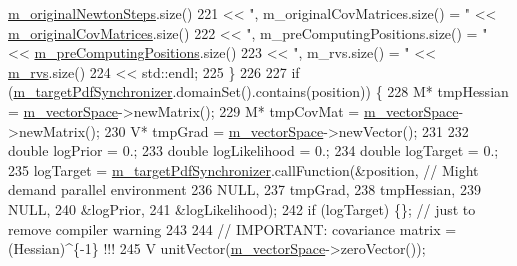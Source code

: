 \begin{DoxyCode}
      \hyperlink{class_q_u_e_s_o_1_1_hessian_cov_matrices_t_k_group_a4c0fe3171a35cdd453a4e23e1438ddf9}{m\_originalNewtonSteps}.size()
221                            << \textcolor{stringliteral}{", m\_originalCovMatrices.size() = "}      << 
      \hyperlink{class_q_u_e_s_o_1_1_hessian_cov_matrices_t_k_group_acc7219917faf933e77694894856fa646}{m\_originalCovMatrices}.size()
222                            << \textcolor{stringliteral}{", m\_preComputingPositions.size() = "}    << 
      \hyperlink{class_q_u_e_s_o_1_1_base_t_k_group_a93d7fe55e30a7c6f209b01cb8a67e322}{m\_preComputingPositions}.size()
223                            << \textcolor{stringliteral}{", m\_rvs.size() = "}                      << \hyperlink{class_q_u_e_s_o_1_1_base_t_k_group_a87c6b02ea45ab3de634c22afa58f53a5}{m\_rvs}.size()
224                            << std::endl;
225   \}
226 
227   \textcolor{keywordflow}{if} (\hyperlink{class_q_u_e_s_o_1_1_hessian_cov_matrices_t_k_group_a22daa22c22e5d9800c3817f6912ca122}{m\_targetPdfSynchronizer}.domainSet().contains(position)) \{
228     M* tmpHessian = \hyperlink{class_q_u_e_s_o_1_1_base_t_k_group_a9930bbda0f3d9368653fb0577b89ec33}{m\_vectorSpace}->newMatrix();
229     M* tmpCovMat  = \hyperlink{class_q_u_e_s_o_1_1_base_t_k_group_a9930bbda0f3d9368653fb0577b89ec33}{m\_vectorSpace}->newMatrix();
230     V* tmpGrad    = \hyperlink{class_q_u_e_s_o_1_1_base_t_k_group_a9930bbda0f3d9368653fb0577b89ec33}{m\_vectorSpace}->newVector();
231 
232     \textcolor{keywordtype}{double} logPrior = 0.;
233     \textcolor{keywordtype}{double} logLikelihood = 0.;
234     \textcolor{keywordtype}{double} logTarget = 0.;
235     logTarget = \hyperlink{class_q_u_e_s_o_1_1_hessian_cov_matrices_t_k_group_a22daa22c22e5d9800c3817f6912ca122}{m\_targetPdfSynchronizer}.callFunction(&position, \textcolor{comment}{// Might demand
       parallel environment}
236                                                      NULL,
237                                                      tmpGrad,
238                                                      tmpHessian,
239                                                      NULL,
240                                                      &logPrior,
241                                                      &logLikelihood);
242     \textcolor{keywordflow}{if} (logTarget) \{\}; \textcolor{comment}{// just to remove compiler warning}
243 
244     \textcolor{comment}{// IMPORTANT: covariance matrix = (Hessian)^\{-1\} !!!}
245     V unitVector(\hyperlink{class_q_u_e_s_o_1_1_base_t_k_group_a9930bbda0f3d9368653fb0577b89ec33}{m\_vectorSpace}->zeroVector());

\end{DoxyCode}
